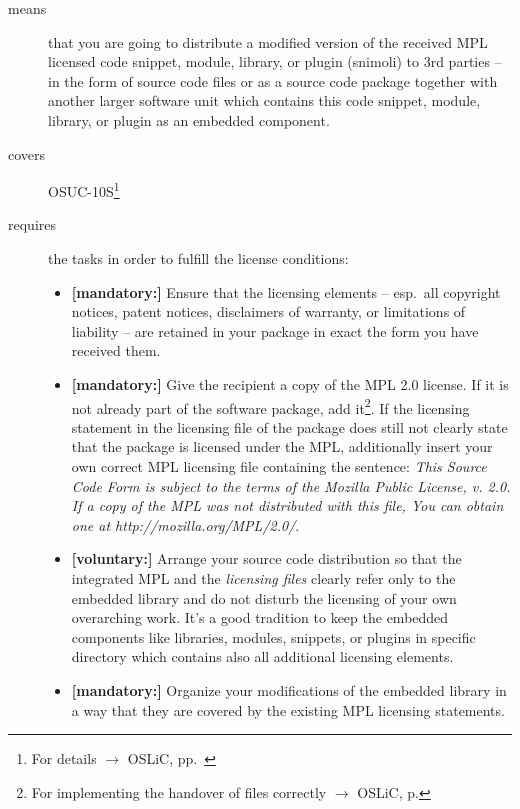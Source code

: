 \begin{description}
\item[means] that you are going to distribute a modified version of the received
MPL licensed code snippet, module, library, or plugin (snimoli) to 3rd parties
-- in the form of source code files or as a source code package together with
another larger software unit which contains this code snippet, module, library,
or plugin as an embedded component.
\item[covers] OSUC-10S\footnote{For details $\rightarrow$ OSLiC, pp.\
\pageref{OSUC-10S-DEF}}
\item[requires] the tasks in order to fulfill the license conditions:
\begin{itemize}

  \item \textbf{[mandatory:]} Ensure that the licensing elements -- esp.\ all
  copyright notices, patent notices, disclaimers of warranty, or limitations of
  liability -- are retained in your package in exact the form you have received
  them.
  
  \item \textbf{[mandatory:]} Give the recipient a copy of the MPL 2.0 license.
  If it is not already part of the software package, add it\footnote{For
  implementing the handover of files correctly $\rightarrow$ OSLiC, p.
  \pageref{DistributingFilesHint}}. If the licensing statement in the licensing
  file of the package does still not clearly state that the package is licensed
  under the MPL, additionally insert your own correct MPL licensing file
  containing the sentence: \emph{This Source Code Form is subject to the terms
  of the Mozilla Public License, v. 2.0. If a copy of the MPL was not
  distributed with this file, You can obtain one at
  http://mozilla.org/MPL/2.0/}.

  \item \textbf{[voluntary:]} Arrange your source code distribution so that the
  integrated MPL and the \emph{licensing files} clearly refer only to the
  embedded library and do not disturb the licensing of your own overarching
  work. It's a good tradition to keep the embedded components like libraries,
  modules, snippets, or plugins in specific directory which contains also all
  additional licensing elements.
  
  \item \textbf{[mandatory:]} Organize your modifications of the embedded
  library in a way that they are covered by the existing MPL licensing
  statements. 


\end{itemize}
\end{description}
